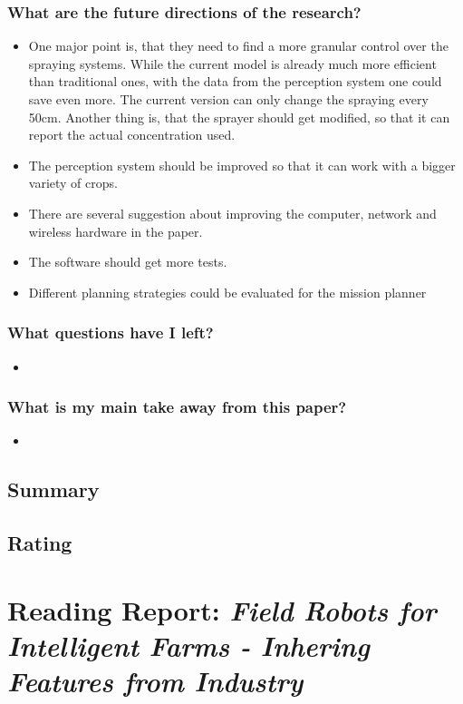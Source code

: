 \documentclass{article}
\begin{document}
\subsubsection*{What are the future directions of the research?}
\begin{itemize}
    \item One major point is, that they need to find a more granular control over the spraying systems. While the current model is already much more efficient than traditional ones, with the data from the perception system one could save even more. The current version can only change the spraying every 50cm. Another thing is, that the sprayer should get modified, so that it can report the actual concentration used.
    \item The perception system should be improved so that it can work with a bigger variety of crops.
    \item There are several suggestion about improving the computer, network and wireless hardware in the paper.
    \item The software should get more tests.
    \item Different planning strategies could be evaluated for the mission planner
\end{itemize}
\subsubsection*{What questions have I left?}
\begin{itemize}
    \item 
\end{itemize}
\subsubsection*{What is my main take away from this paper?}
\begin{itemize}
    \item 
\end{itemize}

\subsection*{Summary}

\subsection*{Rating}



\section{Reading Report: \emph{Field Robots for Intelligent Farms - Inhering Features from Industry}}
\cite{deSantos2020}
\end{document}
